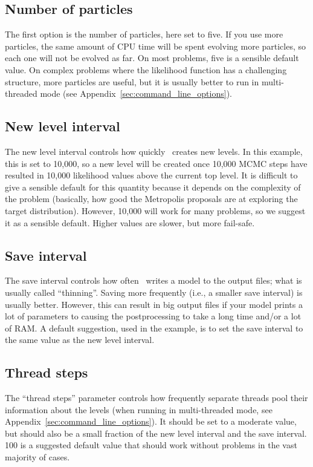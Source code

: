 \documentclass[article]{jss}
\newcommand{\dnest}{\pkg{DNest4}}
\begin{document}
\subsection{Number of particles}
The first option is the number of particles, here set to five.
If you use more particles, the same amount of CPU time will be spent evolving more particles,
so each one will not be evolved as far. On most problems, five is a sensible
default value. On complex problems where the likelihood function has
a challenging structure, more particles are useful, but it is usually better
to run in multi-threaded mode (see Appendix~\ref{sec:command_line_options}).

\subsection{New level interval}
The new level interval controls how quickly \dnest~creates new levels. In this
example, this is set to 10,000, so a new level will be created once 10,000
MCMC steps have resulted in
10,000 likelihood values above the current top level.
It is difficult to give a sensible default for this
quantity because it depends on the complexity of the problem (basically,
how good the Metropolis proposals are at exploring the target distribution).
However, 10,000 will work for many problems, so we suggest it as a sensible
default. Higher values are slower, but more fail-safe.

\subsection{Save interval}
The save interval controls how often \dnest~writes a model to the output
files; what is usually called ``thinning''. Saving more frequently
(i.e., a smaller save interval) is usually better. However, this can result
in
big output files if your model prints a lot of parameters to 
causing the postprocessing to take a long time and/or a lot of RAM.
A default suggestion, used in the example, is to set the save interval to the
same value as the new level interval.

\subsection{Thread steps}
The ``thread steps'' parameter controls how frequently separate threads pool
their information about the levels (when running in multi-threaded mode,
see Appendix~\ref{sec:command_line_options}). It should be set to a moderate
value, but should also be a small fraction of the new level interval and the
save interval. 100 is a suggested default value that should work without
problems in the vast majority of cases.
\end{document}
